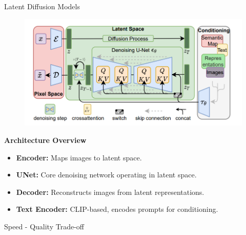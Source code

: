 \begin{frame}[allowframebreaks]{Latent Diffusion Models}
    \begin{figure}
        \centering
        \includegraphics[width=1.05\linewidth,height=0.95\textheight,keepaspectratio]{images/adv-img-gen/slide_97_1_img.png}
    \end{figure}

    \framebreak

    \textbf{Architecture Overview}
    \begin{itemize}
        \item \textbf{Encoder:} Maps images to latent space.
        \item \textbf{UNet:} Core denoising network operating in latent space.
        \item \textbf{Decoder:} Reconstructs images from latent representations.
        \item \textbf{Text Encoder:} CLIP-based, encodes prompts for conditioning.
    \end{itemize}

    \framebreak

    Speed - Quality Trade-off


\end{frame}
